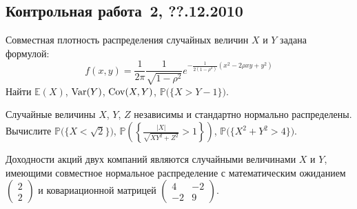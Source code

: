 \documentclass[pdftex,12pt,a4paper]{article}
\newenvironment{enumerate*}{
\begin{enumerate}
  \setlength{\itemsep}{0pt}
  \setlength{\parskip}{0pt}
  \setlength{\parsep}{0pt}
}{\end{enumerate}}
\newcommand{\ofbr}[1]{\bigl( \{ #1 \} \bigr)}     %
\begin{document}
\subsection{Контрольная работа \No\,2, ??.12.2010}
\begin{enumerate*}
\item Совместная плотность распределения случайных величин $X$ и $Y$ задана формулой:
\[
f(x,y)=\frac{1}{2\pi}\frac{1}{\sqrt{1-\rho^2}}e^{-\frac{1}{2(1-\rho^2)}\left(x^2-2\rho xy+y^2\right)}
\]
Найти $\mathbb{E}(X)$, $\operatorname{Var}(Y)$, $\operatorname{Cov}(X,Y)$, $\mathbb{P}\ofbr{X>Y-1}$.
\item Случайные величины $X$, $Y$, $Z$ независимы и стандартно нормально распределены. Вычислите
$\mathbb{P}\ofbr{X<\sqrt2}$, $\mathbb{P}\left(\left\{ \frac{|X|}{\sqrt{XY^2+Z^2}}>1\right\}\right)$, $\mathbb{P}\ofbr{X^2+Y^2>4}$.
\item Доходности акций двух компаний являются случайными величинами $X$ и $Y$, имеющими совместное нормальное распределение с математическим ожиданием $\left( \begin{array}{c}2\\2\end{array}\right)$ и ковариационной матрицей $\left( \begin{array}{cc}4 & -2\\-2 & 9\end{array}\right)$.


\end{enumerate*}
\end{document}
